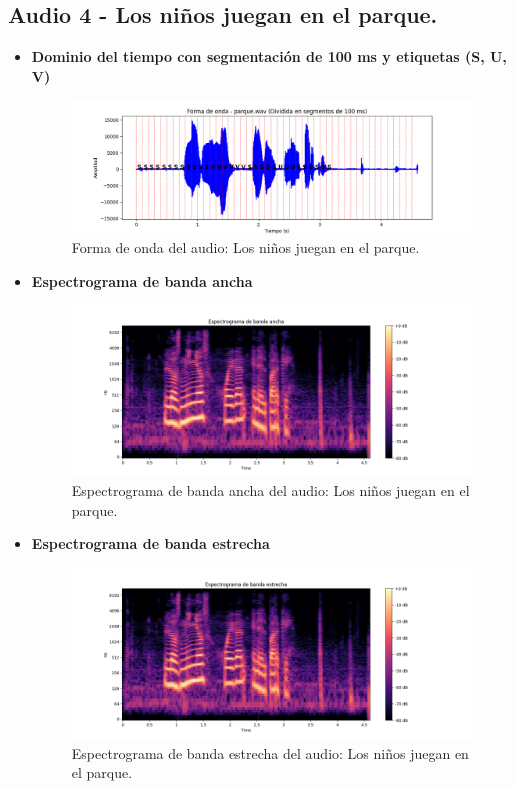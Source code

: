 \documentclass{report}
\begin{document}
\newpage

\subsection{Audio 4 - Los niños juegan en el parque.}
\begin{itemize}
    \item \textbf{Dominio del tiempo con segmentación de 100 ms y etiquetas (S, U, V)}
    \begin{figure}[h]
        \centering
        \includegraphics[width=\linewidth]{a4.png}
        \caption{Forma de onda del audio: Los niños juegan en el parque.}
        \label{fig:forma_onda_audio4div}
    \end{figure}
    \item \textbf{Espectrograma de banda ancha}
    \begin{figure}[h]
        \centering
        \includegraphics[width=\linewidth]{ancha4.png}
        \caption{Espectrograma de banda ancha del audio: Los niños juegan en el parque.}
        \label{fig:espectograma banda ancha audio4}
    \end{figure}
    \newpage
    \item \textbf{Espectrograma de banda estrecha}
    \begin{figure}[h]
        \centering
        \includegraphics[width=\linewidth]{estrecha4.png}
        \caption{Espectrograma de banda estrecha del audio: Los niños juegan en el parque.}
        \label{fig:espectograma banda estrecha audio4}
    \end{figure}
\end{itemize}
\end{document}
